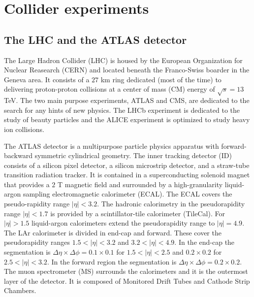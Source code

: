 
\section{Collider experiments}
\label{sec:det}

\subsection{The LHC and the ATLAS detector}
 
The Large Hadron Collider (LHC) is housed by the European Organization for Nuclear Reasearch (CERN) and located beneath the Franco-Swiss boarder in the Geneva area. It consists of a $27$ km ring dedicated (most of the time) to delivering proton-proton collisions at a center of mass (CM) energy of $\sqrt{s}=13$ TeV. The two main purpose experiments, ATLAS and CMS, are dedicated to the search for any hints of new physics. The LHCb experiment is dedicated to the study of beauty particles and the ALICE experiment is optimized to study heavy ion collisions. 

The ATLAS detector is a multipurpose particle physics apparatus with forward-backward symmetric  cylindrical geometry. The inner tracking detector (ID) consists of  a  silicon  pixel detector,  a  silicon  microstrip detector, and a straw-tube transition radiation tracker. It is contained in a superconducting solenoid magnet that provides a $2$ T magnetic field and surrounded by a high-granularity liquid-argon sampling electromagnetic calorimeter (ECAL). The ECAL covers the pseudo-rapidity range $|\eta|<3.2$. The hadronic calorimetry in the pseudorapidity range $|\eta| < 1.7$ is provided by a scintillator-tile calorimeter (TileCal). For $|\eta|>1.5$ liquid-argon calorimeters extend the pseudorapidity range to $|\eta|=4.9$. The LAr calorimeter is divided in end-cap and forward. These cover the pseudorapidity ranges $1.5 < |\eta| < 3.2$ and $3.2 < |\eta| <
4.9$. In the end-cap the segmentation is $\Delta\eta\times\Delta\phi = 0.1 \times 0.1$ for $1.5 < |\eta| < 2.5$ and $0.2 \times 0.2$ for $2.5 < |\eta| < 3.2$. In the forward region the segmentation is $\Delta\eta\times\Delta\phi = 0.2 \times 0.2$. The muon spectrometer (MS) surrounds the calorimeters and it is the outermost layer of the detector. It is composed of Monitored Drift Tubes and Cathode Strip Chambers.


